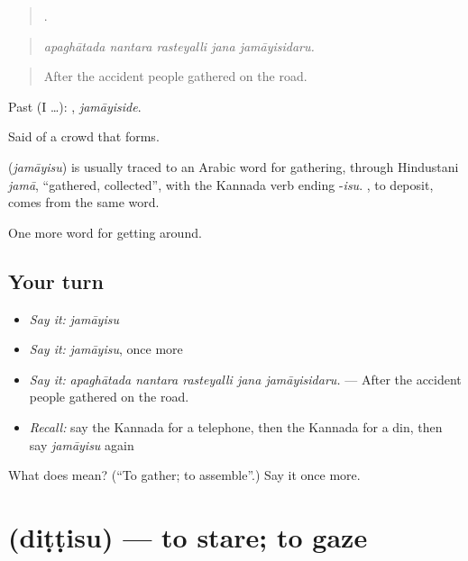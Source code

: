 \begin{quote}
    .
\end{quote}

\begin{quote}
\emph{apaghātada nantara rasteyalli jana jamāyisidaru.}
\end{quote}

\begin{quote}
After the accident people gathered on the road.
\end{quote}

Past (I …): , \emph{jamāyiside}.

Said of a crowd that forms.

\begin{cousinweb}
\textbf{} (\emph{jamāyisu}) is usually traced to an Arabic word for gathering, through Hindustani \emph{jamā}, \textquotedblleft{}gathered, collected\textquotedblright{}, with the Kannada verb ending -\emph{isu}.  , to deposit, comes from the same word.
\end{cousinweb}

\begin{grammarlens}[title={What you've built}]
One more word for getting around.
\end{grammarlens}

\subsection*{Your turn}
\begin{itemize}
\raggedright
  \item \emph{Say it:} \emph{jamāyisu}
  \item \emph{Say it:} \emph{jamāyisu}, once more
  \item \emph{Say it:} \emph{apaghātada nantara rasteyalli jana jamāyisidaru.} — After the accident people gathered on the road.
  \item \emph{Recall:} say the Kannada for a telephone, then the Kannada for a din, then say \emph{jamāyisu} again
\end{itemize}

\begin{tcolorbox}[breakable,colback=teal!4,colframe=teal!35!black,title={Before you move on}]
What does  mean? (\textquotedblleft{}To gather; to assemble\textquotedblright{}.) Say it once more.
\end{tcolorbox}
\section[\texorpdfstring{\kn{ದಿಟ್ಟಿಸು} (diṭṭisu)}{ದಿಟ್ಟಿಸು (diṭṭisu)}]{ (diṭṭisu) — to stare; to gaze}

